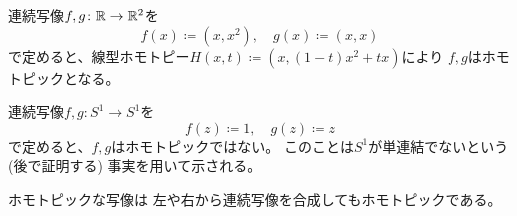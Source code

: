 \documentclass[report]{jlreq}
\begin{document}

\begin{example}[ホモトピックな写像の例]
    連続写像$f, g \colon \mathbb{R} \to \mathbb{R}^2$を
    \begin{equation}
        f(x) \coloneqq (x, x^2), \quad g(x) \coloneqq (x, x)
    \end{equation}
    で定めると、線型ホモトピー$H(x, t) \coloneqq (x, (1 - t) x^2 + t x)$により
    $f, g$はホモトピックとなる。
\end{example}

\begin{example}[ホモトピックでない写像の例]
    連続写像$f, g \colon S^1 \to S^1$を
    \begin{equation}
        f(z) \coloneqq 1, \quad g(z) \coloneqq z
    \end{equation}
    で定めると、$f, g$はホモトピックではない。
    このことは$S^1$が単連結でないという (後で証明する) 事実を用いて示される。
\end{example}

ホモトピックな写像は
左や右から連続写像を合成してもホモトピックである。

\end{document}
